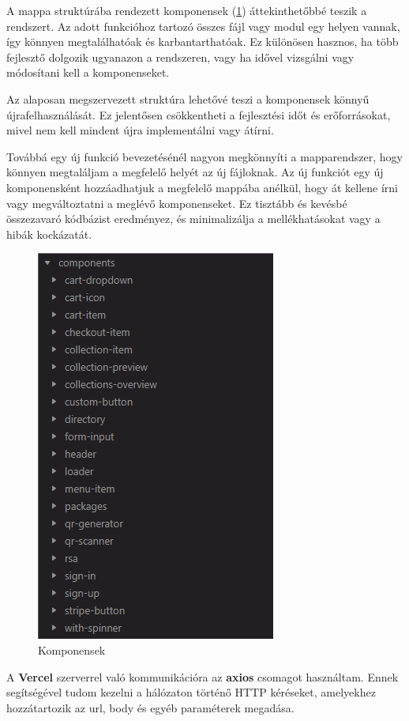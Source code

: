 A mappa struktúrába rendezett komponensek (\ref{abra:components}) áttekinthetőbbé teszik a rendszert. Az adott funkcióhoz tartozó összes fájl vagy modul egy helyen vannak, így könnyen megtalálhatóak és karbantarthatóak. Ez különösen hasznos, ha több fejlesztő dolgozik ugyanazon a rendszeren, vagy ha idővel vizsgálni vagy módosítani kell a komponenseket.

Az alaposan megszervezett struktúra lehetővé teszi a komponensek könnyű újrafelhasználását. Ez jelentősen csökkentheti a fejlesztési időt és erőforrásokat, mivel nem kell mindent újra implementálni vagy átírni.

Továbbá egy új funkció bevezetésénél nagyon megkönnyíti a mapparendszer, hogy könnyen megtaláljam a megfelelő helyét az új fájloknak. Az új funkciót egy új komponensként hozzáadhatjuk a megfelelő mappába anélkül, hogy át kellene írni vagy megváltoztatni a meglévő komponenseket. Ez tisztább és kevésbé összezavaró kódbázist eredményez, és minimalizálja a mellékhatásokat vagy a hibák kockázatát.

\begin{figure}[!h]
	\centering
	\includegraphics[scale=0.6]{images/components}
	\caption{Komponensek}
	\label{abra:components}
\end{figure}

A \textbf{Vercel} szerverrel való kommunikációra az \textbf{axios} csomagot használtam. Ennek segítségével tudom kezelni a hálózaton történő HTTP kéréseket, amelyekhez hozzátartozik az url, body és egyéb paraméterek megadása.

